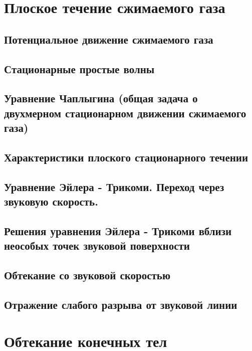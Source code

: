 \documentclass[12pt,a4paper]{book}
\begin{document}
\chapter{Плоское течение сжимаемого газа}
\section{Потенциальное движение сжимаемого газа}\label{sec:p114}
\section{Стационарные простые волны}\label{sec:p115}
\section{Уравнение Чаплыгина (общая задача о двухмерном стационарном движении сжимаемого газа)}\label{sec:p116}
\section{Характеристики плоского стационарного течении}\label{sec:p117}
\section{Уравнение Эйлера - Трикоми. Переход через звуковую скорость.}\label{sec:p118}
\section{Решения уравнения Эйлера - Трикоми вблизи неособых точек звуковой поверхности}\label{sec:p119}
\section{Обтекание со звуковой скоростью}\label{sec:p120}
\section{Отражение слабого разрыва от звуковой линии}\label{sec:p121}

\chapter{Обтекание конечных тел}
\end{document}
